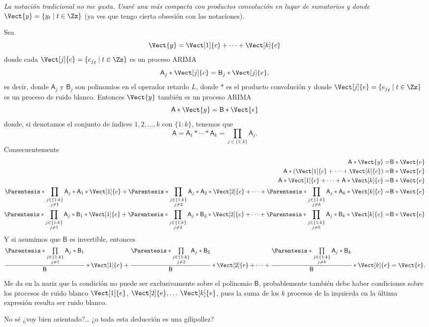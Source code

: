 \documentclass[11pt]{article}
\author{Marcos Bujosa}
\date{\today}
\title{}
\begin{document}
\emph{La notación tradicional no me gusta. Usaré una más compacta con
productos convolución en lugar de sumatorios y donde
\(\Vect{y}=\{y_t\mid t\in\Zz\}\)} (ya ves que tengo cierta obsesión con
las notaciones).
\bigskip

Sea $$\Vect{y}=\Vect[1]{c}+\cdots+\Vect[k]{c}$$ donde cada
\(\Vect[j]{c}=\{{c_j}_t\mid t\in\Zz\}\) es un proceso ARIMA
$$\mathsf{A}_j*\Vect[j]{c}=\mathsf{B}_j*\Vect[j]{e},$$ es decir, donde
\(\mathsf{A}_j\) y \(\mathsf{B}_j\) son polinomios en el operador retardo
\(L\), donde \(*\) es el producto convolución y donde
\(\Vect[j]{e}=\{{e_j}_t\mid t\in\Zz\}\) es un proceso de ruido
blanco. Entonces \(\Vect{y}\) también es un proceso ARIMA
$$\mathsf{A}*\Vect{y}=\mathsf{B}*\Vect{e}$$ donde, si denotamos el
conjunto de índices \(1,2,\ldots,k\) con \(\{1:k\}\), tenemos que
$$\mathsf{A}=\mathsf{A}_1*\cdots*\mathsf{A}_k=\prod\limits_{j\in\{1:k\}}\mathsf{A}_j.$$
Consecuentemente
\begin{align*}
\mathsf{A}*\Vect{y}=&\mathsf{B}*\Vect{e}\\
\mathsf{A}*(\Vect[1]{c}+\cdots+\Vect[k]{c})=&\mathsf{B}*\Vect{e}\\
\mathsf{A}*\Vect[1]{c}+\cdots+\mathsf{A}*\Vect[k]{c}=&\mathsf{B}*\Vect{e}\\
\Parentesis*{\prod\limits_{\substack{j\in\{1:k\}\\j\ne 1}}\mathsf{A}_j}*\mathsf{A}_1*\Vect[1]{c}+
\Parentesis*{\prod\limits_{\substack{j\in\{1:k\}\\j\ne 2}}\mathsf{A}_j}*\mathsf{A}_2*\Vect[2]{c}+
\cdots+
\Parentesis*{\prod\limits_{\substack{j\in\{1:k\}\\j\ne k}}\mathsf{A}_j}*\mathsf{A}_k*\Vect[k]{c}=&\mathsf{B}*\Vect{e}\\
\Parentesis*{\prod\limits_{\substack{j\in\{1:k\}\\j\ne 1}}\mathsf{A}_j}*\mathsf{B}_1*\Vect[1]{e}+
\Parentesis*{\prod\limits_{\substack{j\in\{1:k\}\\j\ne 2}}\mathsf{A}_j}*\mathsf{B}_2*\Vect[2]{e}+
\cdots+
\Parentesis*{\prod\limits_{\substack{j\in\{1:k\}\\j\ne k}}\mathsf{A}_j}*\mathsf{B}_k*\Vect[k]{e}=&\mathsf{B}*\Vect{e}\\
\end{align*}
Y si asumimos que \(\mathsf{B}\) es invertible, entonces
$$\frac{\Parentesis*{\prod\limits_{\substack{j\in\{1:k\}\\j\ne
1}}\mathsf{A}_j}*\mathsf{B}_1}{\mathsf{B}}*\Vect[1]{e}+
\frac{\Parentesis*{\prod\limits_{\substack{j\in\{1:k\}\\j\ne
2}}\mathsf{A}_j}*\mathsf{B}_2}{\mathsf{B}}*\Vect[2]{e}+ \cdots+
\frac{\Parentesis*{\prod\limits_{\substack{j\in\{1:k\}\\j\ne
k}}\mathsf{A}_j}*\mathsf{B}_k}{\mathsf{B}}*\Vect[k]{e}=\Vect{e}.$$

Me da en la nariz que la condición no puede ser exclusivamente sobre
el polinomio \(\mathsf{B}\), probablemente también debe haber
condiciones sobre los procesos de ruido blanco \(\Vect[1]{e}\),
\(\Vect[2]{e},\ldots\) \(\Vect[k]{e}\), pues la suma de los \(k\) procesos
de la izquierda en la última expresión resulta ser ruido blanco.
\bigskip

No sé ¿voy bien orientado?\ldots{} ¿o toda esta deducción es una
gilipollez?
\end{document}
